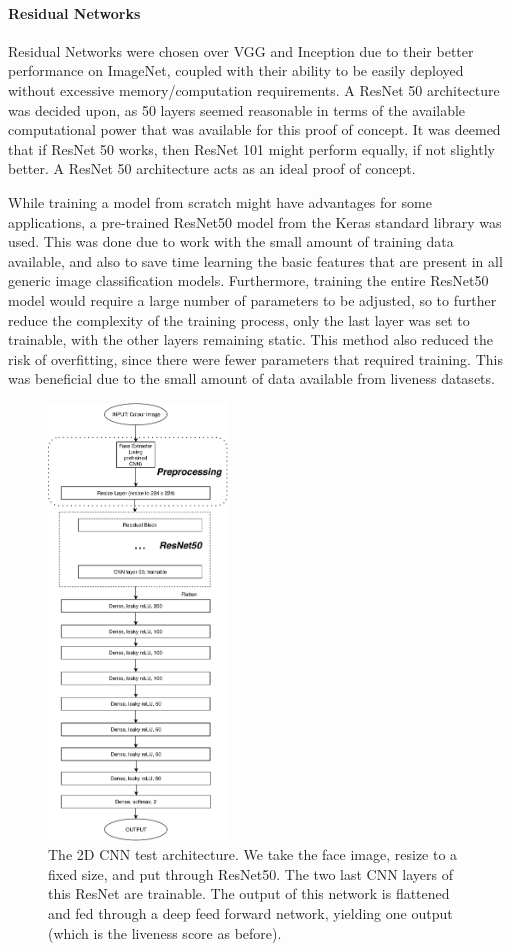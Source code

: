 \documentclass[12pt,a4paper]{article}
\begin{document}
                \paragraph{Residual Networks}
                Residual Networks were chosen over VGG and Inception due to their better performance on ImageNet, coupled with their ability to be easily deployed without excessive memory/computation requirements.
                A ResNet 50 architecture was decided upon, as 50 layers seemed reasonable in terms of the available computational power that was available for this proof of concept. It was deemed that if ResNet 50 works, then ResNet 101 might perform equally, if not slightly better. A ResNet 50 architecture acts as an ideal proof of concept.

                While training a model from scratch might have advantages for some applications, a pre-trained ResNet50 model from the Keras standard library was used. This was done due to work with the small amount of training data available, and also to save time learning the basic features that are present in all generic image classification models. Furthermore, training the entire ResNet50 model would require a large number of parameters to be adjusted, so to further reduce the complexity of the training process, only the last layer was set to trainable, with the other layers remaining static. This method also reduced the risk of overfitting, since there were fewer parameters that required training. This was beneficial due to the small amount of data available from liveness datasets.

                \begin{figure}
                    \centering
                    \includegraphics[width=180px]{2DCNNArchitecture.pdf}
                    \caption{The 2D CNN test architecture. We take the face image, resize to a fixed size, and put through ResNet50. The two last CNN layers
                    of this ResNet are trainable. The output of this network is flattened and fed through a deep feed forward network, yielding one output (which is the
                    liveness score as before).}
                    \label{2DCNNArchitecture}
                \end{figure}
\end{document}
